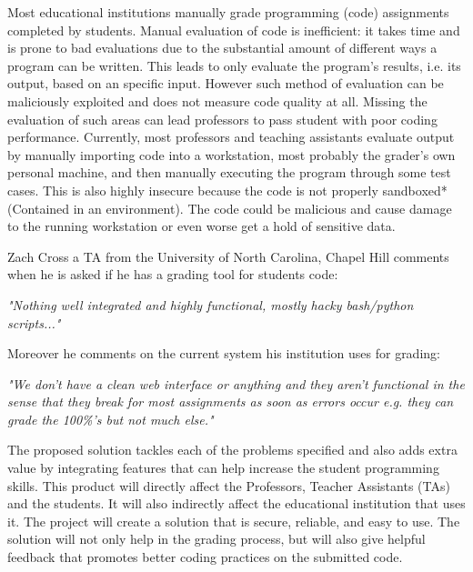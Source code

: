 
Most educational institutions manually grade programming (code) assignments
completed by students. Manual evaluation of code is inefficient: it takes time
and is prone to bad evaluations due to the substantial amount of different ways
a program can be written. This leads to only evaluate the program's results,
i.e. its output, based on an specific input. However such method of evaluation
can be maliciously exploited and does not measure code quality at all. Missing
the evaluation of such areas can lead professors to pass student with poor
coding performance. Currently, most professors and teaching assistants evaluate
output by manually importing code into a workstation, most probably the grader's
own personal machine, and then manually executing the program through some test
cases. This is also highly insecure because the code is not properly sandboxed*
(Contained in an environment). The code could be malicious and cause damage to
the running workstation or even worse get a hold of sensitive data.

Zach Cross a TA from the University of North Carolina, Chapel Hill comments when
he is asked if he has a grading tool for students code:

\textit{"Nothing well integrated and highly functional, mostly hacky bash/python
scripts..."}

Moreover he comments on the current system his institution uses for grading:

\textit{"We don't have a clean web interface or anything and they aren't
functional in the sense that they break for most assignments as soon as errors
occur e.g. they can grade the 100\%'s but not much else."}


The proposed solution tackles each of the problems specified and also adds extra
value by integrating features that can help increase the student programming
skills. This product will directly affect the Professors, Teacher Assistants
(TAs) and the students. It will also indirectly affect the educational
institution that uses it. The project will create a solution that is secure,
reliable, and easy to use. The solution will not only help in the grading
process, but will also give helpful feedback that promotes better coding
practices on the submitted code.
